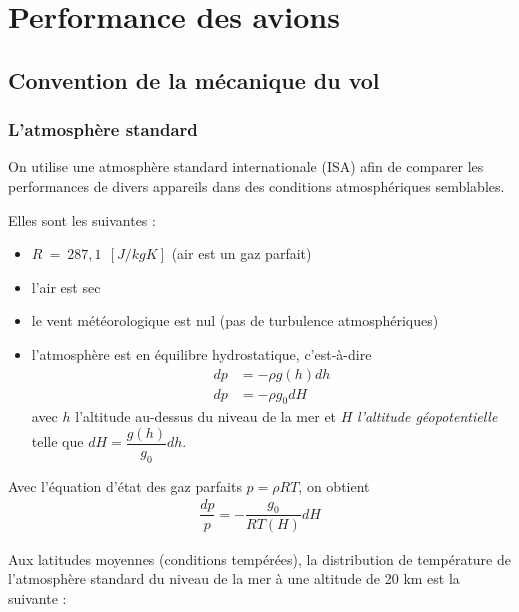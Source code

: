 \documentclass{report}
\begin{document}
\pagestyle{fancy} 
\renewcommand{\footrulewidth}{1pt}

\renewcommand{\thesection}{\arabic{section}}
\renewcommand{\partname}{}
\renewcommand{\labelitemii}{$\bullet$}




\newpage


\chapter{Performance des avions}

\section{Convention de la mécanique du vol}
\subsection{L'atmosphère standard}

On utilise une atmosphère standard internationale (ISA) afin de comparer les performances de divers appareils dans des conditions atmosphériques semblables.

Elles sont les suivantes :
\begin{itemize}
    \item $R ~=~ 287,1~~[J/kgK]$ (air est un gaz parfait)
    \item l'air est sec
    \item le vent météorologique est nul (pas de turbulence atmosphériques)
    \item l’atmosphère est en équilibre hydrostatique, c’est-à-dire\\
    \begin{eqnarray}
    dp&=-\rho g(h) dh\\
    dp&=-\rho g_0 dH
    \end{eqnarray}
    avec $h$ l'altitude au-dessus du niveau de la mer et $H$ \textit{l'altitude géopotentielle} telle que $dH=\dfrac{g(h)}{g_0}dh$.
\end{itemize}

Avec l'équation d'état des gaz parfaits $p=\rho RT$, on obtient
\begin{eqnarray}
\dfrac{dp}{p}=-\dfrac{g_0}{RT(H)}dH
\end{eqnarray}

Aux latitudes moyennes (conditions tempérées), la distribution de température de l’atmosphère standard du niveau de la mer à une altitude de 20 km est la suivante :
\end{document}
